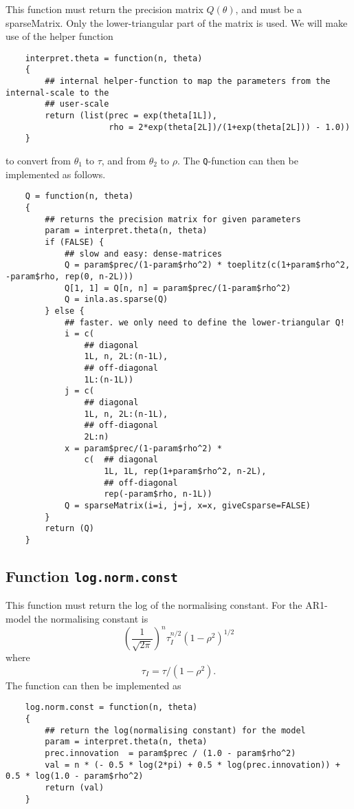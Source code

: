 \documentclass[a4paper,11pt]{article}
\begin{document}
This function must return the precision matrix $Q(\theta)$, and 
must be a sparseMatrix. Only the
lower-triangular part of the matrix is used. We will make use of the
helper function
{\small
\begin{verbatim}
    interpret.theta = function(n, theta)
    {
        ## internal helper-function to map the parameters from the internal-scale to the
        ## user-scale
        return (list(prec = exp(theta[1L]),
                     rho = 2*exp(theta[2L])/(1+exp(theta[2L])) - 1.0))
    }
\end{verbatim}
}
to convert from $\theta_{1}$ to $\tau$, and from $\theta_{2}$ to
$\rho$.  The \texttt{Q}-function can then be implemented as follows.
{\small
\begin{verbatim}
    Q = function(n, theta)
    {
        ## returns the precision matrix for given parameters
        param = interpret.theta(n, theta)
        if (FALSE) {
            ## slow and easy: dense-matrices
            Q = param$prec/(1-param$rho^2) * toeplitz(c(1+param$rho^2, -param$rho, rep(0, n-2L)))
            Q[1, 1] = Q[n, n] = param$prec/(1-param$rho^2)
            Q = inla.as.sparse(Q)
        } else {
            ## faster. we only need to define the lower-triangular Q!
            i = c(
                ## diagonal
                1L, n, 2L:(n-1L),
                ## off-diagonal
                1L:(n-1L))
            j = c(
                ## diagonal
                1L, n, 2L:(n-1L),
                ## off-diagonal
                2L:n)
            x = param$prec/(1-param$rho^2) *
                c(  ## diagonal
                    1L, 1L, rep(1+param$rho^2, n-2L),
                    ## off-diagonal
                    rep(-param$rho, n-1L))
            Q = sparseMatrix(i=i, j=j, x=x, giveCsparse=FALSE)
        }            
        return (Q)
    }
\end{verbatim}
}


\subsection*{Function \texttt{log.norm.const}}

This function must return the log of the normalising constant. For the
AR1-model the normalising constant is
\begin{displaymath}
    \left(\frac{1}{\sqrt{2\pi}}\right)^{n} \tau_{I}^{n/2} (1-\rho^{2})^{1/2}
\end{displaymath}
where
\begin{displaymath}
    \tau_{I} = \tau/(1-\rho^{2}).
\end{displaymath}
The function can then be implemented as
{\small
\begin{verbatim}
    log.norm.const = function(n, theta)
    {
        ## return the log(normalising constant) for the model
        param = interpret.theta(n, theta)
        prec.innovation  = param$prec / (1.0 - param$rho^2)
        val = n * (- 0.5 * log(2*pi) + 0.5 * log(prec.innovation)) + 0.5 * log(1.0 - param$rho^2)
        return (val)
    }
\end{verbatim}
}
\end{document}
